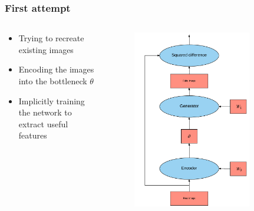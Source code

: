\documentclass{beamer}
\begin{document}
\begin{frame}
\frametitle{First attempt}
\begin{columns}
\begin{column}{0.5\textwidth}
\begin{itemize}
	\item Trying to recreate existing images
	\item Encoding the images into the bottleneck $\theta$
	\item Implicitly training the network to extract useful features
\end{itemize}
\end{column}
\begin{column}{0.5\textwidth}  %
\begin{figure}[h!]
	\centering
	\includegraphics[width=0.8\textwidth]{autoencoder_attempt.png}
\end{figure}
\end{column}
\end{columns}

\end{frame}
\end{document}
